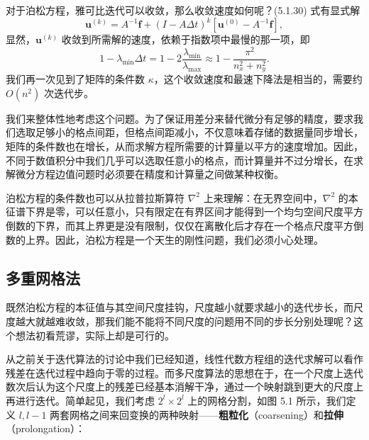 对于泊松方程，雅可比迭代可以收敛，那么收敛速度如何呢？(5.1.30) 式有显式解
\begin{equation}
\bm u^{(k)}=A^{-1}\bm f+(I-A\Delta t)^k[\bm u^{(0)}-A^{-1}\bm f],
\tag{5.1.34}
\end{equation}
显然，$\bm u^{(k)}$ 收敛到所需解的速度，依赖于指数项中最慢的那一项，即
\begin{equation}
1-\lambda_{\min}\Delta t
=1-2\frac{\lambda_{\min}}{\lambda_{\max}}
\approx1-\frac{\pi^2}{n_x^2+n_y^2}.
\tag{5.1.35}
\end{equation}
我们再一次见到了矩阵的条件数 $\kappa$，这个收敛速度和最速下降法是相当的，需要约 $O(n^2)$ 次迭代步。

我们来整体性地考虑这个问题。为了保证用差分来替代微分有足够的精度，要求我们选取足够小的格点间距，但格点间距减小，不仅意味着存储的数据量同步增长，矩阵的条件数也在增长，从而求解方程所需要的计算量以平方的速度增加。因此，不同于数值积分中我们几乎可以选取任意小的格点，而计算量并不过分增长，在求解微分方程边值问题时必须要在精度和计算量之间做某种权衡。

泊松方程的条件数也可以从拉普拉斯算符 $\nabla^2$ 上来理解：在无界空间中，$\nabla^2$ 的本征谱下界是零，可以任意小，只有限定在有界区间才能得到一个均匀空间尺度平方倒数的下界，而其上界更是没有限制，仅仅在离散化后才存在一个格点尺度平方倒数的上界。因此，泊松方程是一个天生的刚性问题，我们必须小心处理。

\subsection{多重网格法}

既然泊松方程的本征值与其空间尺度挂钩，尺度越小就要求越小的迭代步长，而尺度越大就越难收敛，那我们能不能将不同尺度的问题用不同的步长分别处理呢？这个想法初看荒谬，实际上却是可行的。

从之前关于迭代算法的讨论中我们已经知道，线性代数方程组的迭代求解可以看作残差在迭代过程中趋向于零的过程。而多尺度算法的思想在于，在一个尺度上迭代数次后认为这个尺度上的残差已经基本消解干净，通过一个映射跳到更大的尺度上再进行迭代。简单起见，我们考虑 $2^l\times2^l$ 上的网格分割，如图 5.1 所示，我们定义 $l,l-1$ 两套网格之间来回变换的两种映射——\textbf{粗粒化}（coarsening）和\textbf{拉伸}（prolongation）：

